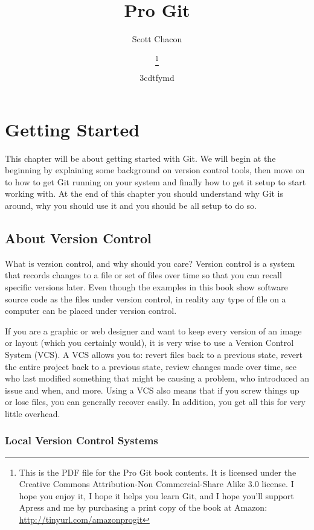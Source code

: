 \documentclass[a4paper]{book}
\title{Pro Git}
\author{Scott Chacon}
\title{\textbf{\savedtitle}}
\author{\textbf{\savedauthor}\thanks{This is the PDF file for the Pro Git book contents. It is licensed under the Creative Commons Attribution-Non Commercial-Share Alike 3.0 license. I hope you enjoy it, I hope it helps you learn Git, and I hope you'll support Apress and me by purchasing a print copy of the book at Amazon: \url{http://tinyurl.com/amazonprogit}}}
\date{\w3cdtfymd}
\makeatletter
\let\savedauthor=\@author
\let\savedtitle=\@title
\newcounter{tab}[chapter]
\newcommand{\chap}[1]{\newpage\thispagestyle{empty}\chapter{#1}\label{chap:\thechapter}}
\makeatother
\begin{document}
\frontmatter
\maketitle
\thispagestyle{empty}
\setcounter{tocdepth}{4}
\tableofcontents\newpage\thispagestyle{empty}

\mainmatter
\fancyhf{}
\fancyhead[LE]{{\small\leftmark}}
\fancyhead[RO]{{\small\rightmark}}
\fancyhead[RE,LO]{{\small\savedauthor\hspace*{1ex}\textbf{\savedtitle}}}
\fancyfoot[LE,RO]{\small\textbf\thepage}
\pagestyle{fancy}

\chap{Getting Started}

This chapter will be about getting started with Git. We will begin at the beginning by explaining some background on version control tools, then move on to how to get Git running on your system and finally how to get it setup to start working with. At the end of this chapter you should understand why Git is around, why you should use it and you should be all setup to do so.

\section{About Version Control}

What is version control, and why should you care? Version control is a system that records changes to a file or set of files over time so that you can recall specific versions later. Even though the examples in this book show software source code as the files under version control, in reality any type of file on a computer can be placed under version control.

If you are a graphic or web designer and want to keep every version of an image or layout (which you certainly would), it is very wise to use a Version Control System (VCS). A VCS allows you to: revert files back to a previous state, revert the entire project back to a previous state, review changes made over time, see who last modified something that might be causing a problem, who introduced an issue and when, and more. Using a VCS also means that if you screw things up or lose files, you can generally recover easily. In addition, you get all this for very little overhead.

\subsection{Local Version Control Systems}
\end{document}
